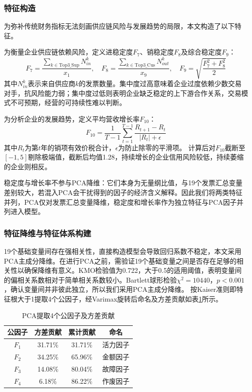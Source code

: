 \documentclass[12pt,a4paper,AutoFakeBold=2]{ctexart}
\begin{document}
\subsubsection{特征构造}

为弥补传统财务指标无法刻画供应链风险与发展趋势的局限，本文构造了以下特征。

为衡量企业供应链依赖风险，定义进稳定度$F_7$、销稳定度$F_8$及综合稳定度$F_9$：
\begin{equation}
F_7 = \frac{\sum_{k \in \text{Top3\_Sup}} N_{in}^k}{x_1}, \quad F_8 = \frac{\sum_{k \in \text{Top3\_Cus}} N_{out}^k}{x_9}, \quad F_9 = \sqrt{\frac{F_7^2 + F_8^2}{2}}
\label{eq:supply_chain}
\end{equation}
其中$N_{in}^k$表示来自供应商$k$的发票数量。集中度过高意味着企业过度依赖少数交易对手，抗风险能力弱；集中度过低则表明企业缺乏稳定的上下游合作关系，交易模式不可预期，经营的可持续性难以判断。

为分析企业的发展趋势，定义平均营收增长率$F_{10}$：
\begin{equation}
F_{10} = \frac{1}{T-1}\sum_{t=1}^{T-1}\frac{R_{t+1} - R_t}{|R_t| + \epsilon}
\label{eq:growth_rate}
\end{equation}
其中$R_t$为第$t$年的销项有效价税合计，$\epsilon$为防止除零的平滑项。
计算后对$F_{10}$截断至$[-1, 5]$剔除极端值，截断后均值1.28，持续增长的企业信用风险较低，持续萎缩的企业则相反。

稳定度与增长率不参与PCA降维：它们本身为无量纲比值，与19个发票汇总变量差别较大，若混入PCA会干扰得到的因子的经济含义解释。因此我们将两类特征并列，PCA仅对发票汇总变量降维，稳定度和增长率作为独立特征与PCA因子并列进入模型。

\subsubsection{特征降维与特征体系构建}
19个基础变量间存在强相关性，直接构造模型会导致回归系数不稳定，本文采用PCA主成分降维。在进行PCA之前，需验证19个基础变量之间是否存在足够的相关性以确保降维有意义。KMO检验值为0.722，大于0.5的适用阈值，表明变量间的偏相关系数相对于简单相关系数较小。Bartlett球形检验$\chi^2=10440$，$p<0.001$，确认变量间并非彼此独立，所以我们采用PCA主成分降维。
按Kaiser准则即特征根大于1提取4个公因子，经Varimax旋转后命名及方差贡献如表\ref{tab:pca}所示。

\begin{table}[H]
\centering
\caption{PCA提取4个公因子及方差贡献}
\label{tab:pca}
\begin{tabular}{cccc}
\toprule
公因子 & 方差贡献 & 累计贡献 & 命名 \\
\midrule
$F_1$ & 31.71\% & 31.71\% & 活力因子 \\
$F_2$ & 34.25\% & 65.96\% & 金额因子 \\
$F_3$ & 14.08\% & 80.04\% & 故障因子 \\
$F_4$ & 6.18\% & 86.22\% & 作废因子 \\
\bottomrule
\end{tabular}
\end{table}
\end{document}
